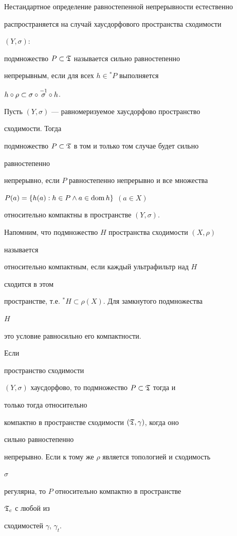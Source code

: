 Нестандартное определение равностепенной непрерывности естественно


распространяется на случай хаусдорфового пространства сходимости


$(Y,\sigma)$:


подмножество $P\subset\frak T$ называется сильно равностепенно


непрерывным, если для всех $h\in{}^*P$ выполняется


$h\circ \rho\subset\sigma\circ \overset{-1}{\sigma}{} \circ h$.





\begin{prop}


Пусть $(Y,\sigma)$ --- равномеризуемое хаусдорфово пространство


сходимости. Тогда


подмножество $P\subset\frak T$ в том и только том случае будет сильно


равностепенно


непрерывно, если $P$ равностепенно непрерывно и все множества


$P(a)=\{h(a):h\in P\wedge a\in\operatorname{dom} h\}$ $(a\in X)$


относительно компактны в пространстве $(Y,\sigma)$.


\end{prop}





Напомним, что подмножество $H$ пространства сходимости $(X,\rho)$


называется


относительно компактным, если каждый ультрафильтр над $H$


сходится в этом


пространстве, т.е. ${}^*H\subset\rho(X)$. Для замкнутого подмножества


$H$


это условие равносильно его компактности.





\begin{thm} Если


пространство сходимости


$(Y,\sigma)$ хаусдорфово, то подмножество $P\subset\frak T$ тогда и


только тогда относительно


компактно в пространстве сходимости $(\frak T,\gamma)$, когда оно


сильно равностепенно


непрерывно. Если к тому же $\rho$ является топологией и сходимость


$\sigma$


регулярна, то $P$ относительно компактно в пространстве


$\frak T_c$ с любой из


сходимостей $\gamma$, $\gamma_t$.


\end{thm}





